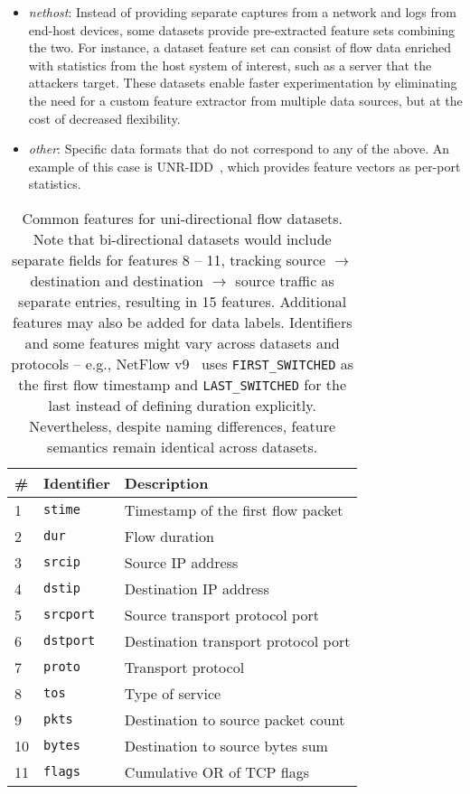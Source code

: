 \begin{itemize}
    \item \emph{nethost}: Instead of providing separate captures from a network and logs from end-host devices, some datasets provide pre-extracted feature sets combining the two. For instance, a dataset feature set can consist of flow data enriched with statistics from the host system of interest, such as a server that the attackers target. These datasets enable faster experimentation by eliminating the need for a custom feature extractor from multiple data sources, but at the cost of decreased flexibility.
    
    \item \emph{other}: Specific data formats that do not correspond to any of the above. An example of this case is UNR-IDD~\cite{das2023_unridd_dataset}, which provides feature vectors as per-port statistics.
\end{itemize}

\begin{table}[t]
    \small
    \centering
    \caption{Common features for uni-directional flow datasets. Note that bi-directional datasets would include separate fields for features 8 -- 11, tracking source $\rightarrow$ destination and destination $\rightarrow$ source traffic as separate entries, resulting in 15 features. Additional features may also be added for data labels. Identifiers and some features might vary across datasets and protocols -- e.g.,  NetFlow v9~\cite{claise2004_rfc3954_netflow} uses \texttt{FIRST\_SWITCHED} as the first flow timestamp and \texttt{LAST\_SWITCHED} for the last instead of defining duration explicitly. Nevertheless, despite naming differences, feature semantics remain identical across datasets.}
    \vspace*{0.4em}
    \begin{tabular}{l l l}
    \textbf{\#} & \textbf{Identifier} & \textbf{Description} \\ \toprule
    1 & \texttt{stime} & Timestamp of the first flow packet \\
    2 & \texttt{dur} & Flow duration \\
    3 & \texttt{srcip} & Source IP address \\
    4 & \texttt{dstip} & Destination IP address \\
    5 & \texttt{srcport} & Source transport protocol port \\
    6 & \texttt{dstport} & Destination transport protocol port \\
    7 & \texttt{proto} & Transport protocol \\
    8 & \texttt{tos} & Type of service \\
    9 & \texttt{pkts} & Destination to source packet count \\
    10 & \texttt{bytes} & Destination to source bytes sum \\
    11 & \texttt{flags} & Cumulative OR of TCP flags \\
    \bottomrule
    \end{tabular}

    \label{tab:flow_features}
\end{table}

